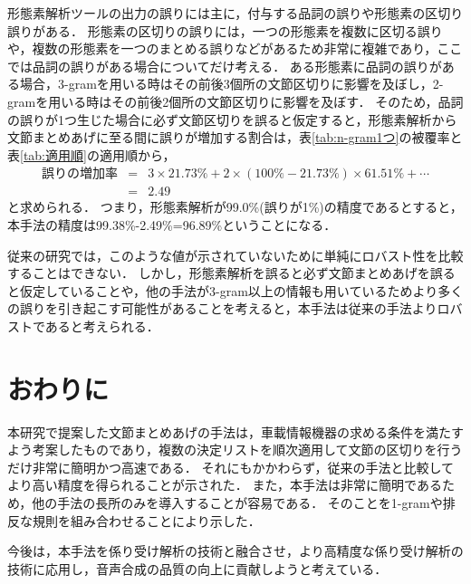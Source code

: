 形態素解析ツールの出力の誤りには主に，付与する品詞の誤りや形態素の区切り誤りがある．
形態素の区切りの誤りには，一つの形態素を複数に区切る誤りや，複数の形態素を一つのまとめる誤りなどがあるため非常に複雑であり，ここでは品詞の誤りがある場合についてだけ考える．
ある形態素に品詞の誤りがある場合，3-gramを用いる時はその前後3個所の文節区切りに影響を及ぼし，2-gramを用いる時はその前後2個所の文節区切りに影響を及ぼす．
そのため，品詞の誤りが1つ生じた場合に必ず文節区切りを誤ると仮定すると，形態素解析から文節まとめあげに至る間に誤りが増加する割合は，表\ref{tab:n-gram1つ}の被覆率と表\ref{tab:適用順}の適用順から，
\begin{eqnarray*}
  誤りの増加率 & = & 3 \times 21.73\% + 2 \times ( 100\% - 21.73\% ) \times 61.51\% + \cdots\\
  & = & 2.49
\end{eqnarray*}
と求められる．
つまり，形態素解析が99.0\%(誤りが1\%)の精度であるとすると，本手法の精度は99.38\%-2.49\%=96.89\%ということになる．

従来の研究では，このような値が示されていないために単純にロバスト性を比較することはできない．
しかし，形態素解析を誤ると必ず文節まとめあげを誤ると仮定していることや，他の手法が3-gram以上の情報も用いているためより多くの誤りを引き起こす可能性があることを考えると，本手法は従来の手法よりロバストであると考えられる．



\section{おわりに}

本研究で提案した文節まとめあげの手法は，車載情報機器の求める条件を満たすよう考案したものであり，複数の決定リストを順次適用して文節の区切りを行うだけ非常に簡明かつ高速である．
それにもかかわらず，従来の手法と比較してより高い精度を得られることが示された．
また，本手法は非常に簡明であるため，他の手法の長所のみを導入することが容易である．
そのことを1-gramや排反な規則を組み合わせることにより示した．

今後は，本手法を係り受け解析の技術と融合させ，より高精度な係り受け解析の技術に応用し，音声合成の品質の向上に貢献しようと考えている．






